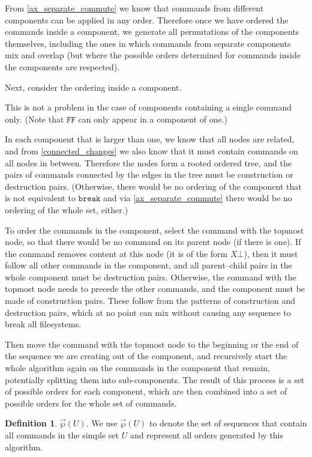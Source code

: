 \documentclass[12pt]{article}
\newcommand{\empt}{\bot}
\newcommand{\cbrk}{\mathtt{break}} %
\newcommand{\fscommand}[2]{{#1#2}}
\newcommand{\fsregcommandchar}[1]{\mathtt{#1}}
\newcommand{\fsregcommand}[2]{\fscommand{\fsregcommandchar{#1}}{\fsregcommandchar{#2}}}
\newcommand{\cff}{\fsregcommand{F}{F}}
\newcommand{\orderset}[1]{\vec{\wp}({#1})}
\theoremstyle{definition}
\newtheorem{mydef}{Definition}
\begin{document}
From \cref{ax_separate_commute} we know that commands from different 
components can be applied in any order.
Therefore once we have ordered the commands inside a component, we generate
all permutations of the components themselves, including the ones
in which commands from separate components mix and overlap
(but where the possible orders determined for commands inside the components are respected).

Next, consider the ordering inside a component.

This is not a problem in the case of components containing a single command only.
(Note that $\cff$ can only appear in a component of one.)

In each component that is larger than one, 
we know that all nodes are related, and from \cref{connected_changes}
we also know that it must contain commands on all nodes in between.
Therefore the nodes
form a rooted ordered tree,
and the pairs of commands connected by the edges in the tree 
must be construction or destruction pairs.
(Otherwise, there would be no ordering of the component that is not equivalent to $\cbrk$
and via \cref{ax_separate_commute} there would be no ordering of the whole set, either.)

To order the commands in the component,
select the command with the topmost node, so that there would be no command
on its parent node (if there is one). 
If the command removes content at this node (it is of the form $X\empt$), 
then it must follow all other commands in the component, and
all parent--child pairs in the whole component must be destruction pairs.
Otherwise, the command with the topmost node needs to precede the other commands,
and the component must be made of construction pairs.
These follow from the patterns of construction and destruction pairs, which
at no point can mix without causing any sequence to break all filesystems.

Then move the command with the topmost node to the beginning or the end of
the sequence we are creating out of the component,
and recursively start the whole algorithm again on the commands in the component that remain,
potentially splitting them into sub-components.
The result of this process is a set of possible orders for each component,
which are then combined into a set of possible orders for the whole set of commands.

\begin{mydef}{$\orderset{U}$.}
We use $\orderset{U}$ to denote the set of sequences that contain all commands in
the simple set $U$
and represent all orders generated by this algorithm.
\end{mydef}
\end{document}
